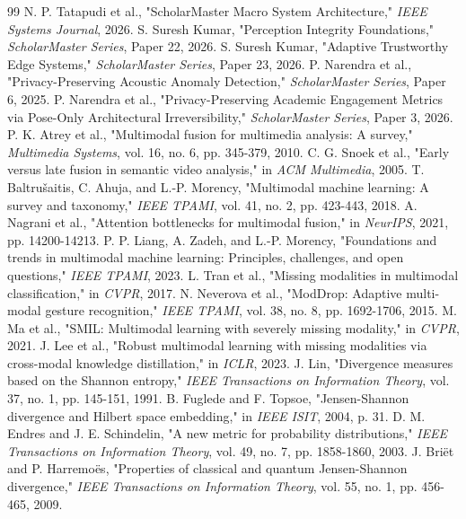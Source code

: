 \documentclass[conference]{IEEEtran}
\begin{document}
\begin{thebibliography}{99}
 N. P. Tatapudi et al., "ScholarMaster Macro System Architecture," \textit{IEEE Systems Journal}, 2026.
 S. Suresh Kumar, "Perception Integrity Foundations," \textit{ScholarMaster Series}, Paper 22, 2026.
 S. Suresh Kumar, "Adaptive Trustworthy Edge Systems," \textit{ScholarMaster Series}, Paper 23, 2026.
 P. Narendra et al., "Privacy-Preserving Acoustic Anomaly Detection," \textit{ScholarMaster Series}, Paper 6, 2025.
 P. Narendra et al., "Privacy-Preserving Academic Engagement Metrics via Pose-Only Architectural Irreversibility," \textit{ScholarMaster Series}, Paper 3, 2026.
 P. K. Atrey et al., "Multimodal fusion for multimedia analysis: A survey," \textit{Multimedia Systems}, vol. 16, no. 6, pp. 345-379, 2010.
 C. G. Snoek et al., "Early versus late fusion in semantic video analysis," in \textit{ACM Multimedia}, 2005.
 T. Baltrušaitis, C. Ahuja, and L.-P. Morency, "Multimodal machine learning: A survey and taxonomy," \textit{IEEE TPAMI}, vol. 41, no. 2, pp. 423-443, 2018.
 A. Nagrani et al., "Attention bottlenecks for multimodal fusion," in \textit{NeurIPS}, 2021, pp. 14200-14213.
 P. P. Liang, A. Zadeh, and L.-P. Morency, "Foundations and trends in multimodal machine learning: Principles, challenges, and open questions," \textit{IEEE TPAMI}, 2023.
 L. Tran et al., "Missing modalities in multimodal classification," in \textit{CVPR}, 2017.
 N. Neverova et al., "ModDrop: Adaptive multi-modal gesture recognition," \textit{IEEE TPAMI}, vol. 38, no. 8, pp. 1692-1706, 2015.
 M. Ma et al., "SMIL: Multimodal learning with severely missing modality," in \textit{CVPR}, 2021.
 J. Lee et al., "Robust multimodal learning with missing modalities via cross-modal knowledge distillation," in \textit{ICLR}, 2023.
 J. Lin, "Divergence measures based on the Shannon entropy," \textit{IEEE Transactions on Information Theory}, vol. 37, no. 1, pp. 145-151, 1991.
 B. Fuglede and F. Topsoe, "Jensen-Shannon divergence and Hilbert space embedding," in \textit{IEEE ISIT}, 2004, p. 31.
 D. M. Endres and J. E. Schindelin, "A new metric for probability distributions," \textit{IEEE Transactions on Information Theory}, vol. 49, no. 7, pp. 1858-1860, 2003.
 J. Briët and P. Harremoës, "Properties of classical and quantum Jensen-Shannon divergence," \textit{IEEE Transactions on Information Theory}, vol. 55, no. 1, pp. 456-465, 2009.

\end{thebibliography}
\end{document}
